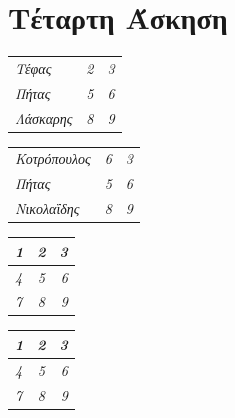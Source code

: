 \documentclass[a4paper,11pt]{article}
\begin{document}
	\pagebreak
	
	\section{Τέταρτη Άσκηση}
	\begin{center}
		\begin{tabular}{l c r}
			\greektext \emph{Τέφας} & \emph{2} & \emph{3}\\
			\greektext \emph{Πήτας} & \emph{5} & \emph{6}\\
			\greektext \emph{Λάσκαρης} & \emph{8} & \emph{9}
			
		\end{tabular}
		
		\vspace{1cm}
		
		\begin{tabular}{| l | c | r |}
			\greektext \emph{Κοτρόπουλος} & \emph{6} & \emph{3}\\
			\greektext \emph{Πήτας} & \emph{5} & \emph{6}\\
			\greektext \emph{Νικολαΐδης} & \emph{8} & \emph{9}
			
		\end{tabular}
		
		\vspace{1cm}
		
		\begin{tabular}{| l | c | r |}
			\hline
			\emph{1}&\emph{2}&\emph{3}\\ \hline
			\emph{4}&\emph{5}&\emph{6}\\ \hline
			\emph{7}&\emph{8}&\emph{9}\\ 
			\hline
		\end{tabular}
		
		\vspace{1cm}
		
		
		\begin{tabular}{| l | c | r |}
			\hline
			\emph{1}&\emph{2}&\emph{3}\\ \hline
			\emph{4}&\emph{5}&\emph{6}\\ \hline
			\emph{7}&\emph{8}&\emph{9}\\ 
			\hline
		\end{tabular}
		
		
		\vspace{1cm}
		

\end{center}
\end{document}
